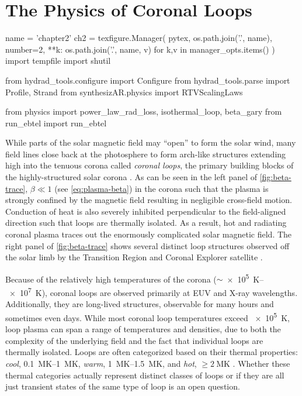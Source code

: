 \chapter{The Physics of Coronal Loops}\label{ch:loops}
\thispagestyle{firstpageofchapterstyle}

\begin{pycode}[chapter2]
name = 'chapter2'
ch2 = texfigure.Manager(
    pytex,
    os.path.join('.', name),
    number=2,
    **{k: os.path.join('.', name, v) for k,v in manager_opts.items()}
)
import tempfile
import shutil

from hydrad_tools.configure import Configure
from hydrad_tools.parse import Profile, Strand
from synthesizAR.physics import RTVScalingLaws

from physics import power_law_rad_loss, isothermal_loop, beta_gary
from run_ebtel import run_ebtel
\end{pycode}

While parts of the solar magnetic field may ``open'' to form the solar wind, many field lines close back at the photosphere to form arch-like structures extending high into the tenuous corona called \textit{coronal loops}, the primary building blocks of the highly-structured solar corona \citep{reale_coronal_2010}. As can be seen in the left panel of \autoref{fig:beta-trace}, $\beta\ll1$ (see \autoref{eq:plasma-beta}) in the corona such that the plasma is strongly confined by the magnetic field resulting in negligible cross-field motion. Conduction of heat is also severely inhibited perpendicular to the field-aligned direction such that loops are thermally isolated. As a result, hot and radiating coronal plasma traces out the enormously complicated solar magnetic field. The right panel of \autoref{fig:beta-trace} shows several distinct loop structures observed off the solar limb by the Transition Region and Coronal Explorer satellite \citep[TRACE,][]{handy_transition_1999}.

Because of the relatively high temperatures of the corona ($\sim$\SIrange{e5}{e7}{\kelvin}), coronal loops are observed primarily at EUV and X-ray wavelengths. Additionally, they are long-lived structures, observable for many hours and sometimes even days. While most coronal loop temperatures exceed \SI{e5}{\kelvin}, loop plasma can span a range of temperatures and densities, due to both the complexity of the underlying field and the fact that individual loops are thermally isolated. Loops are often categorized based on their thermal properties: \textit{cool}, \SIrange{0.1}{1}{\mega\kelvin}, \textit{warm}, \SIrange{1}{1.5}{\mega\kelvin}, and \textit{hot}, $\ge\SI{2}{\mega\kelvin}$ \citep{reale_coronal_2010}. Whether these thermal categories actually represent distinct classes of loops or if they are all just transient states of the same type of loop is an open question. 

